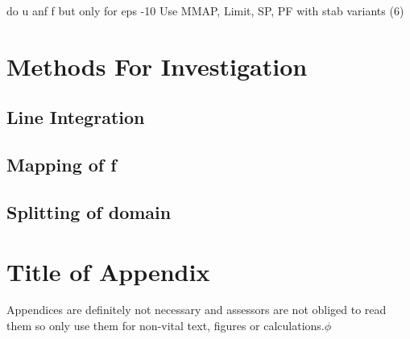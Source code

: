 \documentclass[12pt,a4paper]{article}
\begin{document}
do u anf f but only for eps -10
Use MMAP, Limit, SP, PF
with stab variants (6)
\section{Methods For Investigation}

\subsection{Line Integration}


\subsection{Mapping of f}


\subsection{Splitting of domain}

\printbibliography[heading=bibintoc]

\appendix

\section{Title of Appendix}

Appendices are definitely not necessary and assessors are not obliged to read them so only use them for non-vital text, figures or calculations.$\phi$
\end{document}
